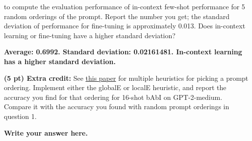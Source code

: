 \documentclass[12pt]{article}
\begin{document}
\begin{enumerate}
        to compute the evaluation performance of in-context few-shot performance for 5 random orderings of the prompt. Report the number you get; the standard deviation of performance for fine-tuning is approximately 0.013. Does in-context learning or fine-tuning have a higher standard deviation?

        \textbf{\color{red}Average: 0.6992. Standard deviation: 0.02161481. In-context learning has a higher standard deviation.}

        \textbf{(5 pt) Extra credit:} See \href{https://arxiv.org/pdf/2104.08786.pdf}{this paper} for multiple heuristics for picking a prompt ordering. Implement either the globalE or localE heuristic, and report the accuracy you find for that ordering for 16-shot bAbI on GPT-2-medium. Compare it with the accuracy you found with random prompt orderings in question 1.

        \textbf{\color{red}Write your answer here.}
    \end{enumerate}
\end{document}

